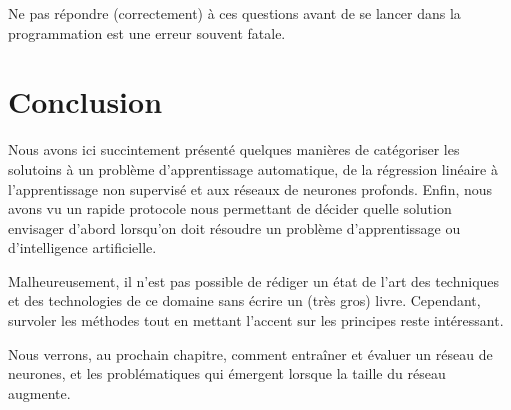 Ne pas répondre (correctement) à ces questions avant de se lancer dans la programmation est une erreur souvent fatale.

\section{Conclusion}
Nous avons ici succintement présenté quelques manières de catégoriser les solutoins à un problème d'apprentissage automatique, de la régression linéaire à l'apprentissage non supervisé et aux réseaux de neurones profonds. Enfin, nous avons vu un rapide protocole nous permettant de décider quelle solution envisager d'abord lorsqu'on doit résoudre un problème d'apprentissage ou d'intelligence artificielle.

Malheureusement, il n'est pas possible de rédiger un état de l'art des techniques et des technologies de ce domaine sans écrire un (très gros) livre. Cependant, survoler les méthodes tout en mettant l'accent sur les principes reste intéressant.

Nous verrons, au prochain chapitre, comment entraîner et évaluer un réseau de neurones, et les problématiques qui émergent lorsque la taille du réseau augmente.